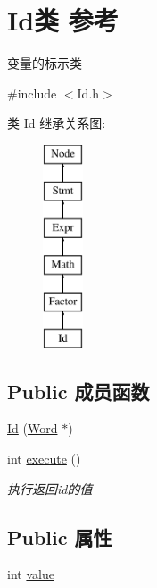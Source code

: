 \hypertarget{class_id}{}\section{Id类 参考}
\label{class_id}


变量的标示类  




{\ttfamily \#include $<$Id.\+h$>$}

类 Id 继承关系图\+:\begin{figure}[H]
\begin{center}
\leavevmode
\includegraphics[height=6.000000cm]{class_id}
\end{center}
\end{figure}
\subsection*{Public 成员函数}
\begin{DoxyCompactItemize}
\item 
\hyperlink{class_id_a22122a40c4a61b6d2f7d20a3cc7c7275}{Id} (\hyperlink{class_word}{Word} $\ast$)
\item 
int \hyperlink{class_id_ae43a9ffecbbc0ac4fd041b8e8e3c3de0}{execute} ()\hypertarget{class_id_ae43a9ffecbbc0ac4fd041b8e8e3c3de0}{}\label{class_id_ae43a9ffecbbc0ac4fd041b8e8e3c3de0}

\begin{DoxyCompactList}\small\item\em 执行返回id的值 \end{DoxyCompactList}\end{DoxyCompactItemize}
\subsection*{Public 属性}
\begin{DoxyCompactItemize}
\item 
int \hyperlink{class_id_af7f7ed479b45ce150b88481b7b996e32}{value}
\end{DoxyCompactItemize}
